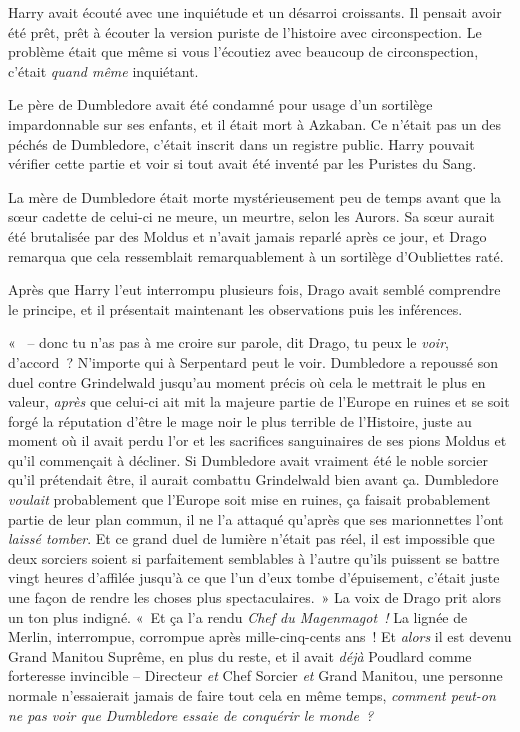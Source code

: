 \later

Harry avait écouté avec une inquiétude et un désarroi croissants. Il pensait avoir été prêt, prêt à écouter la version puriste de l'histoire avec circonspection. Le problème était que même si vous l'écoutiez avec beaucoup de circonspection, c'était \emph{quand même} inquiétant.

Le père de Dumbledore avait été condamné pour usage d'un sortilège impardonnable sur ses enfants, et il était mort à Azkaban. Ce n'était pas un des péchés de Dumbledore, c'était inscrit dans un registre public. Harry pouvait vérifier cette partie et voir si tout avait été inventé par les Puristes du Sang.

La mère de Dumbledore était morte mystérieusement peu de temps avant que la sœur cadette de celui-ci ne meure, un meurtre, selon les Aurors. Sa sœur aurait été brutalisée par des Moldus et n'avait jamais reparlé après ce jour, et Drago remarqua que cela ressemblait remarquablement à un sortilège d'Oubliettes raté.

Après que Harry l'eut interrompu plusieurs fois, Drago avait semblé comprendre le principe, et il présentait maintenant les observations puis les inférences.

«~ -- donc tu n'as pas à me croire sur parole, dit Drago, tu peux le \emph{voir}, d'accord~? N'importe qui à Serpentard peut le voir. Dumbledore a repoussé son duel contre Grindelwald jusqu'au moment précis où cela le mettrait le plus en valeur, \emph{après} que celui-ci ait mit la majeure partie de l'Europe en ruines et se soit forgé la réputation d'être le mage noir le plus terrible de l'Histoire, juste au moment où il avait perdu l'or et les sacrifices sanguinaires de ses pions Moldus et qu'il commençait à décliner. Si Dumbledore avait vraiment été le noble sorcier qu'il prétendait être, il aurait combattu Grindelwald bien avant ça. Dumbledore \emph{voulait} probablement que l'Europe soit mise en ruines, ça faisait probablement partie de leur plan commun, il ne l'a attaqué qu'après que ses marionnettes l'ont \emph{laissé tomber}. Et ce grand duel de lumière n'était pas réel, il est impossible que deux sorciers soient si parfaitement semblables à l'autre qu'ils puissent se battre vingt heures d'affilée jusqu'à ce que l'un d'eux tombe d'épuisement, c'était juste une façon de rendre les choses plus spectaculaires.~» La voix de Drago prit alors un ton plus indigné. «~Et ça l'a rendu \emph{Chef du Magenmagot~!} La lignée de Merlin, interrompue, corrompue après mille-cinq-cents ans~! Et \emph{alors} il est devenu Grand Manitou Suprême, en plus du reste, et il avait \emph{déjà} Poudlard comme forteresse invincible -- Directeur \emph{et} Chef Sorcier \emph{et} Grand Manitou, une personne normale n'essaierait jamais de faire tout cela en même temps, \emph{comment peut-on ne pas voir que Dumbledore essaie de conquérir le monde~?}

